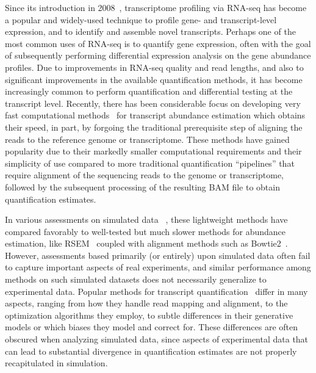 Since its introduction in 2008~\citep{lister,nagalakshmi,mortazavi2008mapping}, transcriptome
profiling via RNA-seq has become a popular and widely-used technique to profile gene-
and transcript-level expression, and to identify and assemble novel transcripts.
Perhaps one of the most common uses of RNA-seq is to quantify gene expression,
often with the goal of subsequently performing differential expression analysis
on the gene abundance profiles. Due to improvements in RNA-seq quality and read
lengths, and also to significant improvements in the available quantification
methods, it has become increasingly common to perform quantification and
differential testing at the transcript level. Recently, there has been
considerable focus on developing very fast computational
methods~\citep{sailfish,kallisto,salmon,fleximer} for transcript abundance
estimation which obtains their speed, in part, by forgoing the traditional
prerequisite step of aligning the reads to the reference genome or
transcriptome. These methods have gained popularity due to their
markedly smaller computational requirements and their simplicity of use compared to more
traditional quantification ``pipelines'' that require alignment of the
sequencing reads to the genome or transcriptome, followed by the subsequent
processing of the resulting BAM file to obtain quantification estimates.

In various assessments on simulated data 
~\citep{kanitz2015comparative,germain2016rnaonthebench,zhang2017evaluation}, these lightweight 
methods have compared favorably to well-tested but much slower methods for
abundance estimation, like RSEM~\citep{li2011rsem} coupled with alignment methods such
as Bowtie2~\citep{bowtie2}. However, assessments based primarily (or entirely)
upon simulated data often fail to capture important aspects of real experiments,
and similar performance among methods on such simulated datasets does not
necessarily generalize to experimental data. Popular methods for transcript
quantification~\citep{rnaskim,fleximer,salmon,kallisto,sailfish,li2011rsem, heraem} 
differ in many aspects, ranging from how they handle read mapping
and alignment, to the optimization algorithms they employ, to subtle differences
in their generative models or which biases they model and correct for. These
differences are often obscured when analyzing simulated data, since aspects of
experimental data that can lead to substantial divergence in quantification
estimates are not properly recapitulated in simulation.

